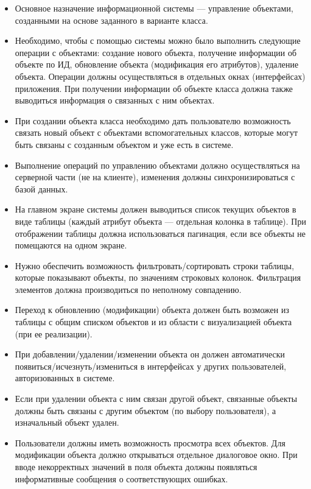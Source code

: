 \documentclass[a4paper,12pt]{article}
\begin{document}
\begin{itemize}[leftmargin=1.2cm]
    \item Основное назначение информационной системы --- управление объектами, созданными на основе заданного в варианте класса.
    \item Необходимо, чтобы с помощью системы можно было выполнить следующие операции с объектами: создание нового объекта, получение информации об объекте по ИД, обновление объекта (модификация его атрибутов), удаление объекта. Операции должны осуществляться в отдельных окнах (интерфейсах) приложения. При получении информации об объекте класса должна также выводиться информация о связанных с ним объектах.
    \item При создании объекта класса необходимо дать пользователю возможность связать новый объект с объектами вспомогательных классов, которые могут быть связаны с созданным объектом и уже есть в системе.
    \item Выполнение операций по управлению объектами должно осуществляться на серверной части (не на клиенте), изменения должны синхронизироваться с базой данных.
    \item На главном экране системы должен выводиться список текущих объектов в виде таблицы (каждый атрибут объекта --- отдельная колонка в таблице). При отображении таблицы должна использоваться пагинация, если все объекты не помещаются на одном экране.
    \item Нужно обеспечить возможность фильтровать/сортировать строки таблицы, которые показывают объекты, по значениям строковых колонок. Фильтрация элементов должна производиться по неполному совпадению.
    \item Переход к обновлению (модификации) объекта должен быть возможен из таблицы с общим списком объектов и из области с визуализацией объекта (при ее реализации).
    \item При добавлении/удалении/изменении объекта он должен автоматически появиться/исчезнуть/измениться в интерфейсах у других пользователей, авторизованных в системе.
    \item Если при удалении объекта с ним связан другой объект, связанные объекты должны быть связаны с другим объектом (по выбору пользователя), а изначальный объект удален.
    \item Пользователи должны иметь возможность просмотра всех объектов. Для модификации объекта должно открываться отдельное диалоговое окно. При вводе некорректных значений в поля объекта должны появляться информативные сообщения о соответствующих ошибках.
\end{itemize}
\end{document}
